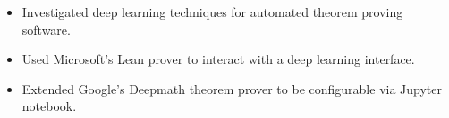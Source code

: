 
\begin{itemize}
    \item Investigated deep learning techniques for automated theorem proving software.
     \item Used Microsoft's Lean prover to interact with a deep learning interface.
    \item Extended Google's Deepmath theorem prover to be configurable via Jupyter notebook.
\end{itemize}

